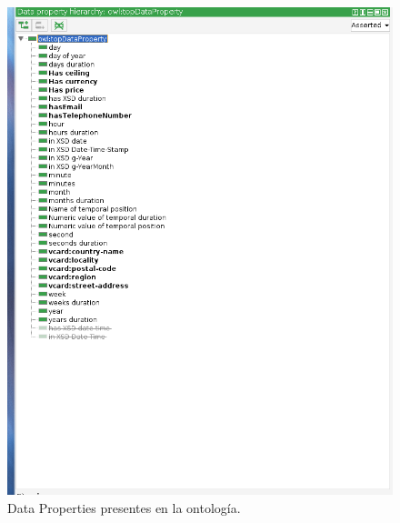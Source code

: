 \documentclass[a4paper,12pt]{article}
\begin{document}
	\begin{figure}[H]
		\centering
		\includegraphics[width=\textwidth]{include/data.png}
		\caption{Data Properties presentes en la ontología.}
	\end{figure}
	
\end{document}
